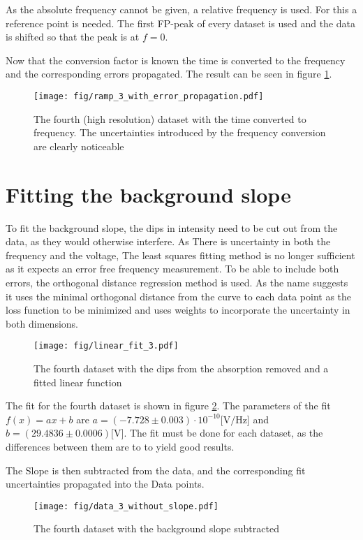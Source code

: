 As the absolute frequency cannot be given, a relative frequency is used. For this a reference point is needed. The first FP-peak of every dataset is
used and the data is shifted so that the peak is at $f = 0$.

Now that the conversion factor is known the time is converted to the frequency and the corresponding errors propagated. The result can be seen in
figure \ref{fig:frequency_conversion}.
\begin{figure}[tb]
	\texttt{[image: fig/ramp\_3\_with\_error\_propagation.pdf]}
	\caption{The fourth (high resolution) dataset with the time converted to frequency. The uncertainties introduced by the frequency conversion are clearly
	noticeable}
	\label{fig:frequency_conversion}
\end{figure}

\section{Fitting the background slope}
To fit the background slope, the dips in intensity need to be cut out from the data, as they would otherwise interfere. As There is uncertainty in
both the frequency and the voltage, The least squares fitting method is no longer sufficient as it expects an error free frequency measurement. To be
able to include both errors, the orthogonal distance regression method is used. As the name suggests it uses the minimal orthogonal distance from the
curve to each data point as the loss function to be minimized and uses weights to incorporate the uncertainty in both dimensions.
\begin{figure}[tb]
	\texttt{[image: fig/linear\_fit\_3.pdf]}
	\caption{The fourth dataset with the dips from the absorption removed and a fitted linear function}
	\label{fig:slope_fit}
\end{figure}

The fit for the fourth dataset is shown in figure \ref{fig:slope_fit}. The parameters of the fit $f(x) = ax + b$ are $a = (-7.728 \pm 0.003) \cdot 10^{-10}
\text{[V/Hz]}$ and $b = (29.4836 \pm 0.0006) \text{[V]}$. The fit must be done for each dataset, as the differences between them are to to yield good
results.

The Slope is then subtracted from the data, and the corresponding fit uncertainties propagated into the Data points.
\begin{figure}[tb]
	\texttt{[image: fig/data\_3\_without\_slope.pdf]}
	\caption{The fourth dataset with the background slope subtracted}
	\label{fig:data_without_slope}
\end{figure}

